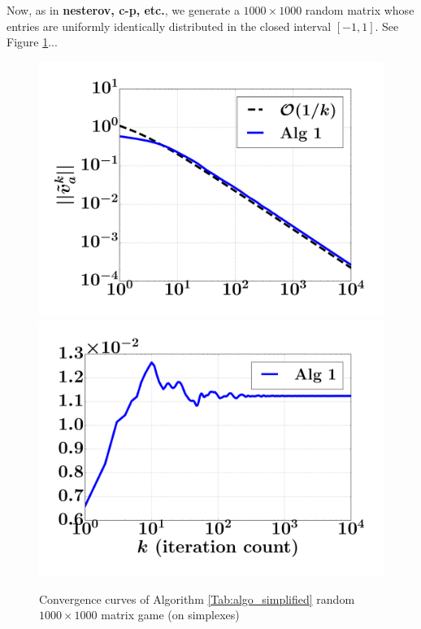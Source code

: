 \documentclass{article} %
\begin{document}
Now, as in \textbf{nesterov, c-p, etc.}, we generate a $1000 \times 1000$ random matrix whose entries are uniformly identically distributed in the closed interval $[-1, 1]$.
See Figure \ref{Tab:sim_dgap_curve}...

\begin{figure}
  \includegraphics[width=1\linewidth]{simplex_dgap.pdf}
  \includegraphics[width=1\linewidth]{simplex_NE.pdf}
  \caption{Convergence curves of Algorithm \ref{Tab:algo_simplified} random $1000 \times 1000$ matrix game (on simplexes)}
  \label{Tab:sim_dgap_curve}
\end{figure}
\end{document}
